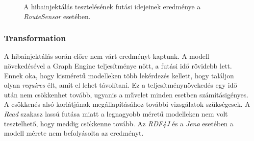 \pagebreak
\begin{figure}[H]
	\centering
	\vspace*{-2cm}
	\caption{A hibainjektálás tesztelésének futási idejeinek eredménye a \emph{RouteSensor} esetében.}
	\label{fig:RouteSensorInjectResult}
\end{figure}

\subsubsection{Transformation}

A hibainjektálás során előre nem várt eredményt kaptunk. A modell növekedésével a Graph Engine teljesítménye nőtt, a futási idő rövidebb lett. Ennek oka, hogy kisméretű modelleken több lekérdezés kellett, hogy találjon olyan \emph{requires} élt, amit el lehet távolítani. Ez a teljesítménynövekedés egy idő után nem csökkenhet tovább, ugyanis a művelet minden esetben számításigényes. A csökkenés alsó korlátjának megállapításához további vizsgálatok szükségesek. A \emph{Read} szakasz lassú futása miatt a legnagyobb méretű modelleken nem volt tesztelhető, hogy meddig csökkenne tovább. Az \emph{RDF4J} és a \emph{Jena} esetében a modell mérete nem befolyásolta az eredményt. 

